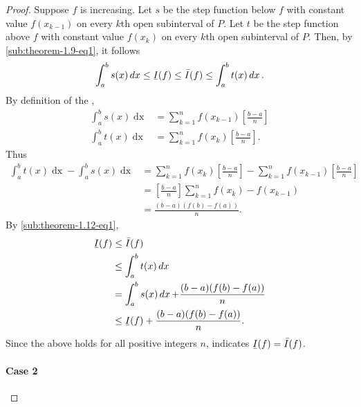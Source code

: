\documentclass{report}
\begin{document}
\begin{proof}
    Suppose $f$ is increasing.
    Let $s$ be the step function below $f$ with constant value $f(x_{k-1})$
      on every $k$th open subinterval of $P$.
    Let $t$ be the step function above $f$ with constant value $f(x_k)$
      on every $k$th open subinterval of $P$.
    Then, by \eqref{sub:theorem-1.9-eq1}, it follows
      \begin{equation}
        \label{sub:theorem-1.12-eq1}
        \int_a^b s(x) \mathop{dx} \leq \ubar{I}(f)
          \leq \bar{I}(f) \leq \int_a^b t(x) \mathop{dx}.
      \end{equation}
    By definition of the ,
      \begin{align*}
        \int_a^b s(x) \mathop{dx}
          & = \sum_{k=1}^n f(x_{k-1})\left[\frac{b - a}{n}\right] \\
        \int_a^b t(x) \mathop{dx}
          & = \sum_{k=1}^n f(x_k)\left[\frac{b - a}{n}\right].
      \end{align*}
    Thus
      \begin{align*}
        \int_a^b t(x) \mathop{dx} - \int_a^b s(x) \mathop{dx}
          & = \sum_{k=1}^n f(x_k)\left[\frac{b - a}{n}\right] -
              \sum_{k=1}^n f(x_{k-1})\left[\frac{b - a}{n}\right] \\
          & = \left[\frac{b - a}{n}\right] \sum_{k=1}^n f(x_k) - f(x_{k-1}) \\
          & = \frac{(b - a)(f(b) - f(a))}{n}.
      \end{align*}
    By \eqref{sub:theorem-1.12-eq1},
      \begin{align*}
        \ubar{I}(f)
          & \leq \bar{I}(f) \\
          & \leq \int_a^b t(x) \mathop{dx} \\
          & = \int_a^b s(x) \mathop{dx} + \frac{(b - a)(f(b) - f(a))}{n} \\
          & \leq \ubar{I}(f) + \frac{(b - a)(f(b) - f(a))}{n}.
      \end{align*}
    Since the above holds for all positive integers $n$,
       indicates $\ubar{I}(f) = \bar{I}(f)$.

  \paragraph{Case 2}%


\end{proof}
\end{document}
